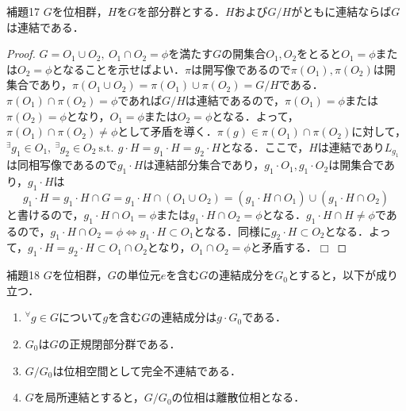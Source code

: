 \documentclass[a4paper,11pt]{jsarticle}
\newtheorem{proof}{証明}
\def\qed{\hfill $\Box$}
\newcommand{\st}{\mathrm{s.t.}\,}  %
\begin{document}
\begin{itembox}[l]{補題17}
$G$を位相群，$H$を$G$を部分群とする．$H$および$G/H$がともに連結ならば$G$は連結である．
\end{itembox}
\vspace{-0.7zh}%
\vspace{-0.7zh}%
\begin{proof}
$G=O_1\cup O_2,{\ }O_1\cap O_2=\phi$を満たす$G$の開集合$O_1,O_2$をとると$O_1=\phi$または$O_2=\phi$となることを示せばよい．$\pi$は開写像であるので$\pi(O_1),\pi(O_2)$は開集合であり，$\pi(O_1\cup O_2)=\pi(O_1)\cup\pi(O_2)=G/H$である．$\pi(O_1)\cap\pi(O_2)=\phi$であれば$G/H$は連結であるので，$\pi(O_1)=\phi$または$\pi(O_2)=\phi$となり，$O_1=\phi$または$O_2=\phi$となる．よって，$\pi(O_1)\cap\pi(O_2)\neq\phi$として矛盾を導く．$\pi(g)\in\pi(O_1)\cap\pi(O_2)$に対して，$^\exists g_1\in O_1,{\ } ^\exists g_2\in O_2{\ }\st{\ }g\cdot H=g_1\cdot H=g_2\cdot H$となる．ここで，$H$は連結であり$L_{g_1}$は同相写像であるので$g_1\cdot H$は連結部分集合であり，$g_1\cdot O_1,g_1\cdot O_2$は開集合であり，$g_1\cdot H$は
\begin{equation*}
g_1\cdot H=g_1\cdot H\cap G=g_1\cdot H\cap (O_1\cup O_2)=(g_1\cdot H\cap O_1)\cup (g_1\cdot H\cap O_2)
\end{equation*}
と書けるので，$g_1\cdot H\cap O_1=\phi$または$g_1\cdot H\cap O_2=\phi$となる．$g_1\cdot H\cap H\neq\phi$であるので，$g_1\cdot H\cap O_2=\phi \Longleftrightarrow g_1\cdot H\subset O_1$となる．同様に$g_2\cdot H\subset O_2$となる．よって，$g_1\cdot H=g_2\cdot H\subset O_1\cap O_2$となり，$O_1\cap O_2=\phi$と矛盾する．\qed

\end{proof}
\begin{itembox}[l]{補題18}
$G$を位相群，$G$の単位元$e$を含む$G$の連結成分を$G_0$とすると，以下が成り立つ．
\vspace{-0.7zh}%
\begin{enumerate}
\renewcommand{\labelenumi}{(\arabic{enumi})}
\item $^\forall g\in G$について$g$を含む$G$の連結成分は$g\cdot G_0$である．
\item $G_0$は$G$の正規閉部分群である．
\item $G/G_0$は位相空間として完全不連結である．
\item $G$を局所連結とすると，$G/G_0$の位相は離散位相となる．
\end{enumerate}
\end{itembox}
\vspace{-0.7zh}%
\end{document}
